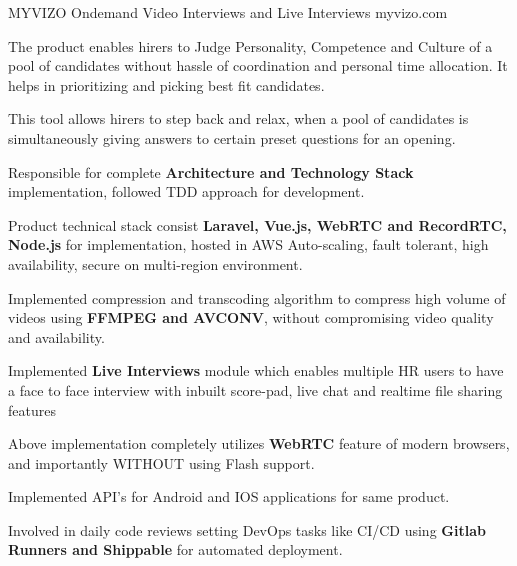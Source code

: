 

\begin{cventries}

  \cventry
    {MYVIZO} %
    {Ondemand Video Interviews and Live Interviews} %
    {myvizo.com} %
    { } %
    {
      \begin{cvitems} %
        \item {The product enables hirers to Judge Personality, Competence and Culture of a pool of candidates without hassle of coordination and personal time allocation. It helps in prioritizing and picking best fit candidates.}
        \item {This tool allows hirers to step back and relax, when a pool of candidates is simultaneously giving answers to certain preset questions for an opening.}
        \item {Responsible for complete \textbf{Architecture and Technology Stack} implementation, followed TDD approach for development.}
        \item {Product technical stack consist \textbf{Laravel, Vue.js, WebRTC and RecordRTC, Node.js} for implementation, hosted in AWS Auto-scaling, fault tolerant, high availability, secure on multi-region environment.}
        \item {Implemented compression and transcoding algorithm to compress high volume of videos using \textbf{FFMPEG and AVCONV}, without compromising video quality and availability.}
        \item {Implemented \textbf{Live Interviews} module which enables multiple HR users to have a face to face interview with inbuilt score-pad, live chat and realtime file sharing features}
        \item {Above implementation completely utilizes \textbf{WebRTC} feature of modern browsers, and importantly WITHOUT using Flash support.}
        \item {Implemented API's for Android and IOS applications for same product.}
        \item {Involved in daily code reviews setting DevOps tasks like CI/CD using \textbf{Gitlab Runners and Shippable} for automated deployment.}

\end{cvitems}}
\end{cventries}
